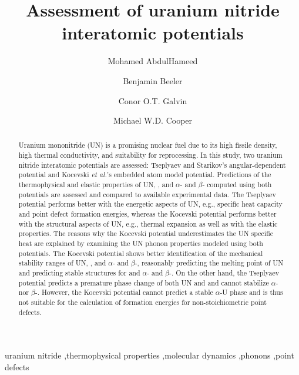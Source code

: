 \documentclass[preprint, 12pt]{elsarticle}
\begin{document}
\begin{frontmatter}

\title{Assessment of uranium nitride interatomic potentials}

\author[ncsu]{Mohamed AbdulHameed}
\author[ncsu,inl]{Benjamin Beeler}
\author[lanl]{Conor O.T. Galvin}
\author[lanl]{Michael W.D. Cooper}

\address[ncsu]{Department of Nuclear Engineering, North Carolina State University, Raleigh, NC 27695}
\address[inl]{Idaho National Laboratory, Idaho Falls, ID 83415}
\address[lanl]{Los Alamos National Laboratory, Los Alamos, NM 87545}

\begin{abstract}

Uranium mononitride (UN) is a promising nuclear fuel due to its high fissile density, high thermal conductivity, and suitability for reprocessing. In this study, two uranium nitride interatomic potentials are assessed: Tseplyaev and Starikov's angular-dependent potential and Kocevski \textit{et al.}'s embedded atom model potential. Predictions of the thermophysical and elastic properties of UN, , and $\alpha$- and $\beta$- computed using both potentials are assessed and compared to available experimental data. The Tseplyaev potential performs better with the energetic aspects of UN, e.g., specific heat capacity and point defect formation energies, whereas the Kocevski potential performs better with the structural aspects of UN, e.g., thermal expansion as well as with the elastic properties. The reasons why the Kocevski potential underestimates the UN specific heat are explained by examining the UN phonon properties modeled using both potentials. The Kocevski potential shows better identification of the mechanical stability ranges of UN, , and $\alpha$- and $\beta$-, reasonably predicting the melting point of UN and predicting stable structures for  and $\alpha$- and $\beta$-. On the other hand, the Tseplyaev potential predicts a premature phase change of both UN and  and cannot stabilize $\alpha$- nor $\beta$-. However, the Kocevski potential cannot predict a stable $\alpha$-U phase and is thus not suitable for the calculation of formation energies for non-stoichiometric point defects.

\end{abstract}

\begin{keyword}
uranium nitride \sep thermophysical properties \sep molecular dynamics \sep phonons \sep point defects
\end{keyword}

\end{frontmatter}
\end{document}
